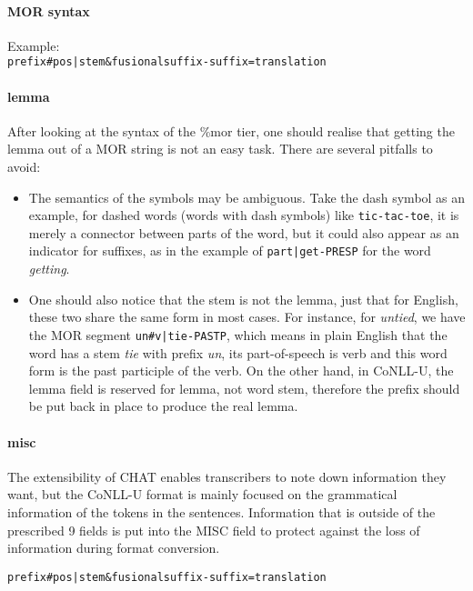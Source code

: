 \paragraph{MOR syntax}
Example:\\
\texttt{prefix\#pos|stem\&fusionalsuffix-suffix=translation}



\paragraph{lemma} After looking at the syntax of the \%mor tier, one should realise that getting the lemma out of a MOR string is not an easy task. There are several pitfalls to avoid:\\
\begin{itemize}
	\item The semantics of the symbols may be ambiguous. Take the dash symbol as an example, for dashed words (words with dash symbols) like \texttt{tic-tac-toe}, it is merely a connector between parts of the word, but it could also appear as an indicator for suffixes, as in the example of \texttt{part|get-PRESP} for the word \emph{getting}.
	\item One should also notice that the stem is not the lemma, just that for English, these two share the same form in most cases. For instance, for \emph{untied}, we have the MOR segment \texttt{un\#v|tie-PASTP}, which means in plain English that the word has a stem \emph{tie} with prefix \emph{un}, its part-of-speech is verb and this word form is the past participle of the verb. On the other hand, in CoNLL-U, the lemma field is reserved for lemma, not word stem, therefore the prefix should be put back in place to produce the real lemma.
\end{itemize}

\paragraph{misc}
The extensibility of CHAT enables transcribers to note down information they want, but the CoNLL-U format is mainly focused on the grammatical information of the tokens in the sentences. Information that is outside of the prescribed 9 fields is put into the MISC field to protect against the loss of information during format conversion.


\texttt{prefix\#pos|stem\&fusionalsuffix-suffix=translation}

